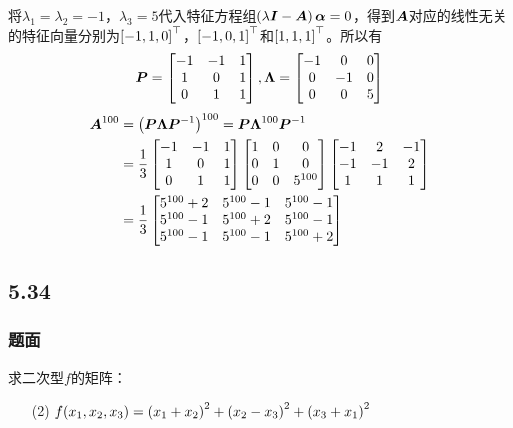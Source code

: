 \documentclass[9pt,xcolor=svgnames]{beamer} %
\begin{document}
\begin{frame}[allowframebreaks]
    将\(\lambda_1=\lambda_2=-1\)，\(\lambda_3=5\)代入特征方程组\(\left( \lambda\boldsymbol{I}-\boldsymbol{A} \right)\boldsymbol{\alpha}=0\)，得到\(\boldsymbol{A}\)对应的线性无关的特征向量分别为\(\left[ -1,1,0 \right]^\top\)，\(\left[ -1,0,1 \right]^\top\)和\(\left[ 1,1,1 \right]^\top\)。所以有
    \begin{equation*}
        \boldsymbol{P}=\begin{bmatrix}-1&-1&1\\1&0&1\\0&1&1\end{bmatrix},\boldsymbol{\Lambda}=\begin{bmatrix}-1&0&0\\0&-1&0\\0&0&5\end{bmatrix}
    \end{equation*}
    \begin{align*}
        \boldsymbol{A}^{100} & =\left( \boldsymbol{P}\boldsymbol{\Lambda}{\boldsymbol{P}}^{-1} \right)^{100}=\boldsymbol{P}\boldsymbol{\Lambda}^{100}{\boldsymbol{P}}^{-1}                                                                                                   \\
                    & =\frac{1}{3}\begin{bmatrix}-1&-1&1\\1&0&1\\0&1&1\end{bmatrix}\begin{bmatrix}1&0&0\\0&1&0\\0&0&5^{100}\end{bmatrix}\begin{bmatrix}-1&2&-1\\-1&-1&2\\1&1&1\end{bmatrix} \\
                    & =\frac{1}{3}\begin{bmatrix}5^{100}+2&5^{100}-1&5^{100}-1\\5^{100}-1&5^{100}+2&5^{100}-1\\5^{100}-1&5^{100}-1&5^{100}+2\end{bmatrix}
    \end{align*}
\end{frame}

\subsection*{5.34}
\begin{frame}
    \frametitle{题面}
    求二次型\(f\)的矩阵：
    \begin{enumerate}
        \item[(2)] \(f(x_1,x_2,x_3)=\left( x_1+x_2 \right)^2+\left( x_2-x_3 \right)^2+\left( x_3+x_1 \right)^2\)
    \end{enumerate}
\end{frame}
\end{document}
